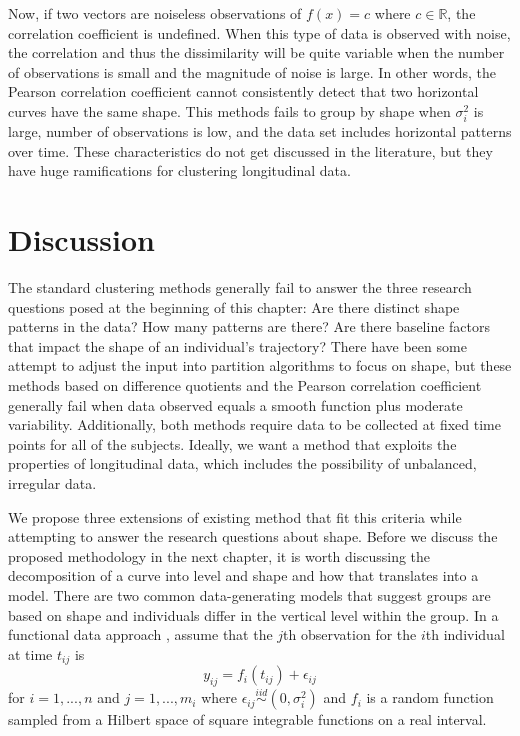 Now, if two vectors are noiseless observations of $f(x)=c$ where $c\in\mathbb{R}$,  the correlation coefficient is undefined. When this type of data is observed with noise, the correlation and thus the dissimilarity will be quite variable when the number of observations is small and the magnitude of noise is large. In other words, the Pearson correlation coefficient cannot consistently detect that two horizontal curves have the same shape. This methods fails to group by shape when $\sigma_{i}^{2}$ is large, number of observations is low, and the data set includes horizontal patterns over time. These characteristics do not get discussed in the literature, but they have huge ramifications for clustering longitudinal data.

\section{Discussion}
The standard clustering methods generally fail to answer the three research questions posed at the beginning of this chapter: Are there distinct shape patterns in the data? How many patterns are there? Are there baseline factors that impact the shape of an individual's trajectory? There have been some attempt to adjust the input into partition algorithms to focus on shape, but these methods based on difference quotients and the Pearson correlation coefficient generally fail when data observed equals a smooth function plus moderate variability. Additionally, both methods require data to be collected at fixed time points for all of the subjects. Ideally, we want a method that exploits the properties of longitudinal data, which includes the possibility of unbalanced, irregular data.

We propose three extensions of existing method that fit this criteria while attempting to answer the research questions about shape. Before we discuss the proposed methodology in the next chapter, it is worth discussing the decomposition of a curve into level and shape and how that translates into a model. There are two common data-generating models that suggest groups are based on shape and individuals differ in the vertical level within the group. In a functional data approach \cite{ramsay2002}, assume that the $j$th observation for the $i$th individual at time $t_{ij}$ is
$$y_{ij}= f_i(t_{ij})+\epsilon_{ij}$$
for $i=1,...,n$ and $j=1,...,m_{i}$ where $\epsilon_{ij}\overset{iid}{\sim} (0,\sigma_{i}^{2})$ and $f_{i}$ is a random function sampled from a Hilbert space of square integrable functions on a real interval. 

